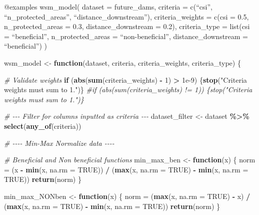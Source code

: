 \documentclass[
]{article}
\newenvironment{Shaded}{\begin{snugshade}}{\end{snugshade}}
\newcommand{\AttributeTok}[1]{\textcolor[rgb]{0.13,0.29,0.53}{#1}}
\newcommand{\CommentTok}[1]{\textcolor[rgb]{0.56,0.35,0.01}{\textit{#1}}}
\newcommand{\ConstantTok}[1]{\textcolor[rgb]{0.56,0.35,0.01}{#1}}
\newcommand{\ControlFlowTok}[1]{\textcolor[rgb]{0.13,0.29,0.53}{\textbf{#1}}}
\newcommand{\DecValTok}[1]{\textcolor[rgb]{0.00,0.00,0.81}{#1}}
\newcommand{\FloatTok}[1]{\textcolor[rgb]{0.00,0.00,0.81}{#1}}
\newcommand{\FunctionTok}[1]{\textcolor[rgb]{0.13,0.29,0.53}{\textbf{#1}}}
\newcommand{\NormalTok}[1]{#1}
\newcommand{\OtherTok}[1]{\textcolor[rgb]{0.56,0.35,0.01}{#1}}
\newcommand{\SpecialCharTok}[1]{\textcolor[rgb]{0.81,0.36,0.00}{\textbf{#1}}}
\newcommand{\StringTok}[1]{\textcolor[rgb]{0.31,0.60,0.02}{#1}}
\begin{document}
@examples wsm\_model( dataset = future\_dams, criteria = c(``csi'',
``n\_protected\_areas'', ``distance\_downstream''), criteria\_weights =
c(csi = 0.5, n\_protected\_areas = 0.3, distance\_downstream = 0.2),
criteria\_type = list(csi = ``beneficial'', n\_protected\_areas =
``non-beneficial'', distance\_downstream = ``beneficial'') )

\begin{Shaded}
\begin{Highlighting}[]
\NormalTok{wsm\_model }\OtherTok{\textless{}{-}} \ControlFlowTok{function}\NormalTok{(dataset, criteria, criteria\_weights, criteria\_type) \{}
  
  \CommentTok{\# Validate weights }
  \ControlFlowTok{if}\NormalTok{ (}\FunctionTok{abs}\NormalTok{(}\FunctionTok{sum}\NormalTok{(criteria\_weights) }\SpecialCharTok{{-}} \DecValTok{1}\NormalTok{) }\SpecialCharTok{\textgreater{}} \FloatTok{1e{-}9}\NormalTok{) \{}\FunctionTok{stop}\NormalTok{(}\StringTok{"Criteria weights must sum to 1."}\NormalTok{)\}}
  \CommentTok{\#if (abs(sum(criteria\_weights) != 1)) \{stop("Criteria weights must sum to 1.")\}}
  
  \CommentTok{\# {-}{-}{-} Filter for columns inputted as criteria {-}{-}{-} }
\NormalTok{  dataset\_filter }\OtherTok{\textless{}{-}}\NormalTok{ dataset }\SpecialCharTok{\%\textgreater{}\%} \FunctionTok{select}\NormalTok{(}\FunctionTok{any\_of}\NormalTok{(criteria))}
  
  \CommentTok{\# {-}{-}{-}{-} Min{-}Max Normalize data {-}{-}{-}{-} }
  
  \CommentTok{\# Beneficial and Non beneficial functions}
\NormalTok{  min\_max\_ben }\OtherTok{\textless{}{-}} \ControlFlowTok{function}\NormalTok{(x) \{}
\NormalTok{    norm }\OtherTok{=}\NormalTok{ (x }\SpecialCharTok{{-}} \FunctionTok{min}\NormalTok{(x, }\AttributeTok{na.rm =} \ConstantTok{TRUE}\NormalTok{)) }\SpecialCharTok{/}\NormalTok{ (}\FunctionTok{max}\NormalTok{(x, }\AttributeTok{na.rm =} \ConstantTok{TRUE}\NormalTok{) }\SpecialCharTok{{-}} \FunctionTok{min}\NormalTok{(x, }\AttributeTok{na.rm =} \ConstantTok{TRUE}\NormalTok{))}
    \FunctionTok{return}\NormalTok{(norm)}
\NormalTok{  \}}
  
\NormalTok{  min\_max\_NONben }\OtherTok{\textless{}{-}} \ControlFlowTok{function}\NormalTok{(x) \{}
\NormalTok{    norm }\OtherTok{=}\NormalTok{ (}\FunctionTok{max}\NormalTok{(x, }\AttributeTok{na.rm =} \ConstantTok{TRUE}\NormalTok{) }\SpecialCharTok{{-}}\NormalTok{ x) }\SpecialCharTok{/}\NormalTok{ (}\FunctionTok{max}\NormalTok{(x, }\AttributeTok{na.rm =} \ConstantTok{TRUE}\NormalTok{) }\SpecialCharTok{{-}} \FunctionTok{min}\NormalTok{(x, }\AttributeTok{na.rm =} \ConstantTok{TRUE}\NormalTok{))}
    \FunctionTok{return}\NormalTok{(norm)}
\NormalTok{  \}}
  

\end{Highlighting}
\end{Shaded}
\end{document}
